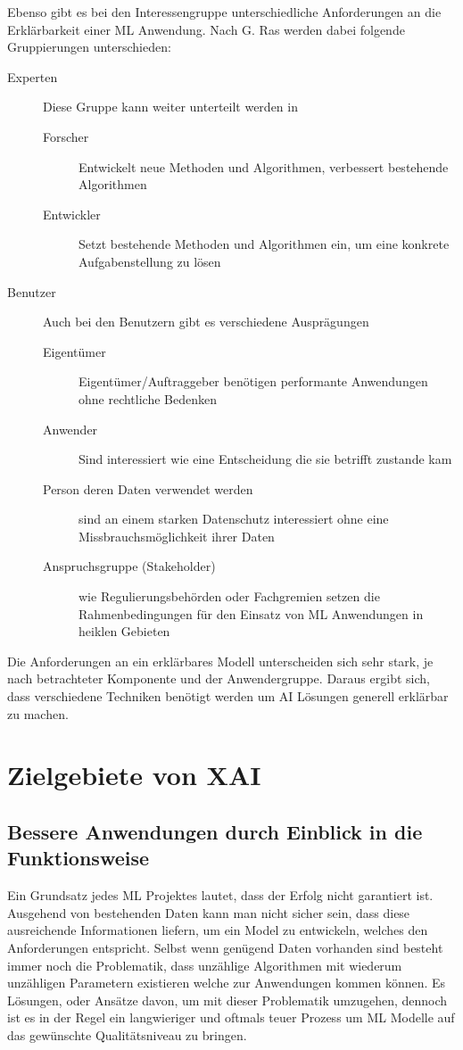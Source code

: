 \documentclass[
  12pt, %
  a4paper, %
  oneside, %
  openany, 
  numbers=noenddot, %
  BCOR=5mm, %
  parskip=half*, %
  thesis, %
]{bfhbook}
\begin{document}
Ebenso gibt es bei den Interessengruppe unterschiedliche Anforderungen an die Erklärbarkeit einer ML Anwendung. Nach G. Ras \parencite{Ras2018} werden dabei folgende Gruppierungen unterschieden:
\begin{description}
  \item[Experten]
  Diese Gruppe kann weiter unterteilt werden in
  	\begin{description}
  		\item[Forscher] Entwickelt neue Methoden und Algorithmen, verbessert bestehende Algorithmen
  		\item[Entwickler] Setzt bestehende Methoden und Algorithmen ein, um eine konkrete Aufgabenstellung zu lösen
	\end{description}
  \item[Benutzer]
  Auch bei den Benutzern gibt es verschiedene Ausprägungen
  	\begin{description}
  		\item[Eigentümer] Eigentümer/Auftraggeber benötigen performante Anwendungen ohne rechtliche Bedenken
  		\item[Anwender] Sind interessiert wie eine Entscheidung die sie betrifft zustande kam
  		\item[Person deren Daten verwendet werden] sind an einem starken Datenschutz interessiert ohne eine Missbrauchsmöglichkeit ihrer Daten
  		\item[Anspruchsgruppe (Stakeholder)] wie Regulierungsbehörden oder Fachgremien setzen die Rahmenbedingungen für den Einsatz von \Gls{ML} Anwendungen in heiklen Gebieten
	\end{description}
\end{description}
Die Anforderungen an ein erklärbares Modell unterscheiden sich sehr stark, je nach betrachteter Komponente und der Anwendergruppe. Daraus ergibt sich, dass verschiedene Techniken benötigt werden um AI Lösungen generell erklärbar zu machen.

\section{Zielgebiete von XAI}

\subsection{Bessere Anwendungen durch Einblick in die Funktionsweise}
Ein Grundsatz jedes \Gls{ML} Projektes lautet, dass der Erfolg nicht garantiert ist. Ausgehend von bestehenden Daten kann man nicht sicher sein, dass diese ausreichende Informationen liefern, um ein Model zu entwickeln, welches den Anforderungen entspricht. Selbst wenn genügend Daten vorhanden sind besteht immer noch die Problematik, dass unzählige Algorithmen mit wiederum unzähligen Parametern existieren welche zur Anwendungen kommen können. Es Lösungen, oder Ansätze davon, um mit dieser Problematik umzugehen, dennoch ist es in der Regel ein langwieriger und oftmals teuer Prozess um \Gls{ML} Modelle auf das gewünschte Qualitätsniveau zu bringen.
\end{document}
